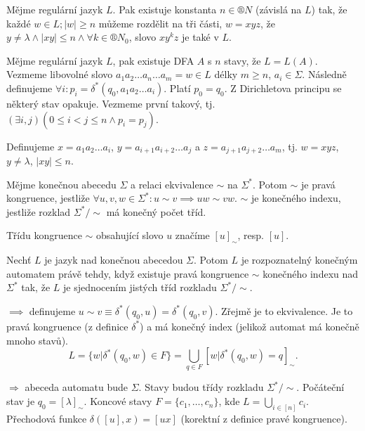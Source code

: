 \documentclass[12pt]{article}                   %
\begin{document}
    \begin{veta}
        Mějme regulární jazyk $L$. Pak existuje konstanta $n \in ®N$ (závislá na $L$) tak, že každé $w \in L; |w| ≥ n$ můžeme rozdělit na tři části, $w = xyz$, že $y ≠ \lambda \land |xy| ≤ n \land \forall k \in ®N_0$, slovo $xy^kz$ je také v $L$.

        \begin{dukazin}
            Mějme regulární jazyk $L$, pak existuje DFA $A$ s $n$ stavy, že $L = L(A)$. Vezmeme libovolné slovo $a_1a_2…a_n…a_m = w \in L$ délky $m ≥ n$, $a_i \in \Sigma$. Následně definujeme $\forall i: p_i = \delta^*(q_0, a_1a_2…a_i)$. Platí $p_0 = q_0$. Z Dirichletova principu se některý stav opakuje. Vezmeme první takový, tj. $(\exists i, j)(0 ≤ i < j ≤ n \land p_i = p_j)$.

            Definujeme $x = a_1a_2…a_i$, $y = a_{i+1}a_{i+2}…a_j$ a $z = a_{j+1}a_{j+2}…a_m$, tj. $w = xyz$, $y ≠ \lambda$, $|xy| ≤ n$.
        \end{dukazin}
    \end{veta}


    \begin{definice}
        Mějme konečnou abecedu $\Sigma$ a relaci ekvivalence $\sim$ na $\Sigma^*$. Potom $\sim$ je pravá kongruence, jestliže $\forall u, v, w \in \Sigma^*: u \sim v \implies uw \sim vw$. $\sim$ je konečného indexu, jestliže rozklad $\Sigma^* / \sim$ má konečný počet tříd.

        Třídu kongruence $\sim$ obsahující slovo $u$ značíme $[u]_\sim$, resp. $[u]$.
    \end{definice}

    \begin{veta}
        Nechť $L$ je jazyk nad konečnou abecedou $\Sigma$. Potom $L$ je rozpoznatelný konečným automatem právě tehdy, když existuje pravá kongruence $\sim$ konečného indexu nad $\Sigma^*$ tak, že $L$ je sjednocením jistých tříd rozkladu $\Sigma^* / \sim$.

        \begin{dukazin}
            $\implies$ definujeme $u \sim v ≡ \delta^*(q_0, u) = \delta^*(q_0, v)$. Zřejmě je to ekvivalence. Je to pravá kongruence (z definice $\delta^*$) a má konečný index (jelikož automat má konečně mnoho stavů).
            $$ L = \{w|\delta^*(q_0, w) \in F\} = \bigcup_{q \in F} [w | \delta^*(q_0, w) = q]_\sim. $$ 

            $\Rightarrow$ abeceda automatu bude $\Sigma$. Stavy budou třídy rozkladu $\Sigma^* / \sim$. Počáteční stav je $q_0 = [\lambda]_\sim$. Koncové stavy $F = \{c_1, …, c_n\}$, kde $L = \bigcup_{i \in [n]} c_i$. Přechodová funkce $\delta([u], x) = [ux]$ (korektní z definice pravé kongruence).
        \end{dukazin}
    \end{veta}
\end{document}
